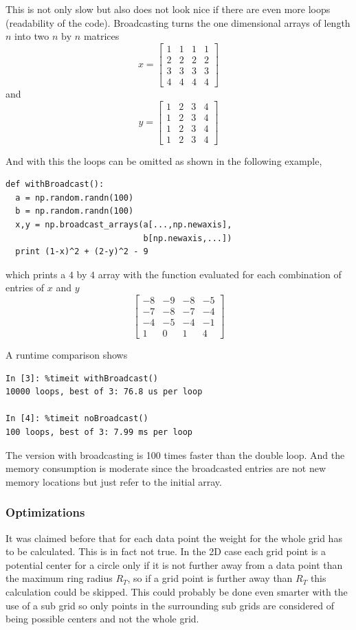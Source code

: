\documentclass[11pt]{scrreprt}
\begin{document}
This is not only slow but also does not look nice if there are even more loops (readability of the code).
Broadcasting turns the one dimensional arrays of length $n$ into two $n\text{ by }n$ matrices
\[
  x = \begin{bmatrix}
  1 & 1 & 1 & 1 \\
  2 & 2 & 2 & 2 \\
  3 & 3 & 3 & 3\\
  4 & 4 & 4 & 4
  \end{bmatrix}
\]
and
\[
  y = \begin{bmatrix}
  1 & 2 & 3 & 4 \\
  1 & 2 & 3 & 4 \\
  1 & 2 & 3 & 4 \\
  1 & 2 & 3 & 4 
\end{bmatrix}
\]
\noindent\begin{minipage}{\linewidth}
And with this the loops can be omitted as shown in the following example,
\begin{lstlisting}
def withBroadcast():
  a = np.random.randn(100)
  b = np.random.randn(100) 
  x,y = np.broadcast_arrays(a[...,np.newaxis],
                            b[np.newaxis,...])
  print (1-x)^2 + (2-y)^2 - 9
\end{lstlisting}  
\end{minipage}
which prints a $4$ by $4$ array with the function evaluated for each combination of entries of $x$ and $y$
\[
  \begin{bmatrix}
    -8& -9& -8& -5\\
    -7& -8& -7& -4\\
    -4& -5& -4& -1\\
     1&  0&  1&  4
       \end{bmatrix}
\]
%
\begin{minipage}{\linewidth}
A runtime comparison shows   
\begin{lstlisting}
In [3]: %timeit withBroadcast()
10000 loops, best of 3: 76.8 us per loop

In [4]: %timeit noBroadcast()
100 loops, best of 3: 7.99 ms per loop
\end{lstlisting}
The version with broadcasting is 100 times faster than the double loop. And the memory consumption is moderate since the 
broadcasted entries are not new memory locations but just refer to the initial array.
\end{minipage}


\subsubsection{Optimizations} %
\label{ssub:optimizations}
It was claimed before that for each data point the weight for the whole grid has to be calculated. This is in fact not true. In the 2D case 
each grid point is a potential center for a circle only if it is not further away from a data point than the maximum ring radius $R_T$, 
so if a grid point is further away than $R_T$ this calculation could be skipped. This could probably be done even smarter with the use of a 
sub grid so only points in the surrounding sub grids are considered of being possible centers and not the whole grid.
\end{document}
